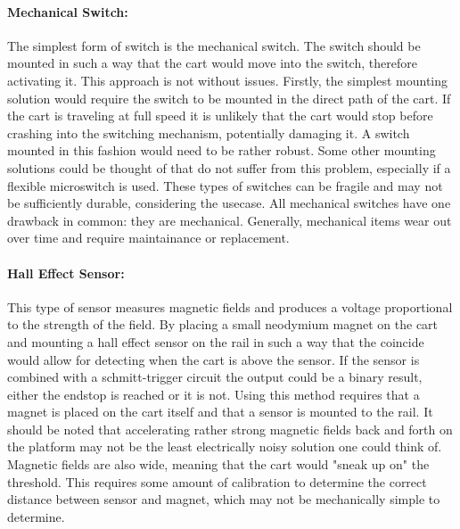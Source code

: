 \paragraph{Mechanical Switch:} %
\label{par:mechanical_switch}
The simplest form of switch is the mechanical switch.
The switch should be mounted in such a way that the cart would move into the switch, therefore activating it.
This approach is not without issues.
Firstly, the simplest mounting solution would require the switch to be mounted in the direct path of the cart.
If the cart is traveling at full speed it is unlikely that the cart would stop before crashing into the switching mechanism, potentially damaging it.
A switch mounted in this fashion would need to be rather robust.
Some other mounting solutions could be thought of that do not suffer from this problem, especially if a flexible microswitch is used.
These types of switches can be fragile and may not be sufficiently durable, considering the usecase.
All mechanical switches have one drawback in common: they are mechanical.
Generally, mechanical items wear out over time and require maintainance or replacement.
\paragraph{Hall Effect Sensor:} %
\label{par:hall_effect_sensor}
This type of sensor measures magnetic fields and produces a voltage proportional to the strength of the field.
By placing a small neodymium magnet on the cart and mounting a hall effect sensor on the rail in such a way that the coincide would allow for detecting when the cart is above the sensor.
If the sensor is combined with a schmitt-trigger circuit the output could be a binary result, either the endstop is reached or it is not.
Using this method requires that a magnet is placed on the cart itself and that a sensor is mounted to the rail.
It should be noted that accelerating rather strong magnetic fields back and forth on the platform may not be the least electrically noisy solution one could think of.
Magnetic fields are also wide, meaning that the cart would "sneak up on" the threshold.
This requires some amount of calibration to determine the correct distance between sensor and magnet, which may not be mechanically simple to determine. 
